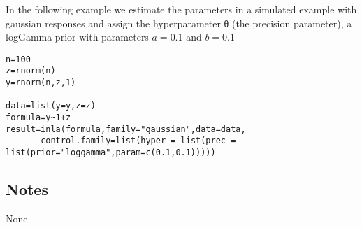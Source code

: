 \documentclass[a4paper,11pt]{article}
\begin{document}
In the following example we estimate the parameters in a simulated
example with gaussian responses and assign the hyperparameter θ (the
precision parameter), a logGamma prior with parameters $a=0.1$ and
$b=0.1$


\begin{verbatim}
n=100
z=rnorm(n)
y=rnorm(n,z,1)

data=list(y=y,z=z)
formula=y~1+z
result=inla(formula,family="gaussian",data=data,
       control.family=list(hyper = list(prec = list(prior="loggamma",param=c(0.1,0.1)))))
\end{verbatim}

\subsection*{Notes}
None
\end{document}
